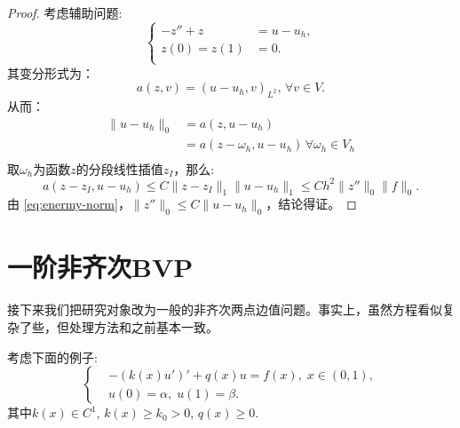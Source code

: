 \documentclass[lang=cn,10pt,newtx]{elegantbook}
\newcommand{\norm}[1]{\|#1\|}
\begin{document}
\begin{proof}
  考虑辅助问题:
  \begin{equation}
    \label{eq:auxiliaryProb}
    \left\{
    \begin{aligned}
        -z''+z&=u-u_{h},\\
        z(0)=z(1)&=0.\\
    \end{aligned}
    \right.
  \end{equation}
  其变分形式为：
  \begin{equation}
    a(z,v)=(u-u_{h},v)_{L^{2}},\,\forall v\in V.
  \end{equation}
  从而：
  \begin{equation}
    \begin{aligned}
      \norm{u-u_{h}}_{0}&=a(z,u-u_{h})\\
      &=a(z-\omega_{h},u-u_{h})\,\forall\omega_{h}\in V_{h}\\
    \end{aligned}
  \end{equation}
  取$\omega_{h}$为函数$z$的分段线性插值$z_{I}$，那么:
  \begin{equation}
    a(z-z_{I},u-u_{h})\le C\norm{z-z_{I}}_{1}\norm{u-u_{h}}_{1}\le Ch^{2}\norm{z''}_{0}\norm{f}_{0}.
  \end{equation}
  由 \eqref{eq:enermy-norm}，$\norm{z''}_{0}\le C\norm{u-u_{h}}_{0}$，结论得证。
\end{proof}
\section{一阶非齐次BVP}
接下来我们把研究对象改为一般的非齐次两点边值问题。事实上，虽然方程看似复杂了些，但处理方法和之前基本一致。

考虑下面的例子:
\begin{equation}
  \label{eq:unhomobvp}
  \left\{
    \begin{aligned}
      &-(k(x)u')'+q(x)u=f(x),\;x\in(0,1),\\
      &u(0)=\alpha,\; u(1)=\beta.
    \end{aligned}
  \right.
\end{equation}
其中$k(x)\in C^{1}$, $k(x)\ge k_{0}>0$, $q(x)\ge 0$.
\end{document}
